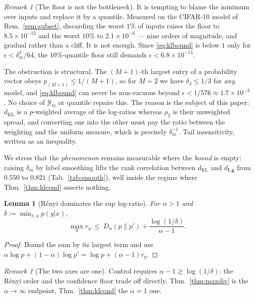 \documentclass[10pt,letterpaper,twocolumn]{article}
\newcommand{\Y}{\mathcal{Y}}
\newcommand{\bff}{\mathbf{f}}
\newcommand{\bfg}{\mathbf{g}}
\newcommand{\dKL}{d_{\mathrm{KL}}}
\newcommand{\dfg}{d_{\bff,\bfg}}
\newcommand{\Dalpha}{D_{\alpha}}
\theoremstyle{plain}
\newtheorem{lemma}[theorem]{Lemma}
\theoremstyle{definition}
\theoremstyle{remark}
\newtheorem{remark}[theorem]{Remark}
\begin{document}
\begin{remark}[The floor is not the bottleneck]
\label{rem:quantile}
It is tempting to blame the minimum over inputs and replace it by a quantile.
Measured on the CIFAR-10 model of Rem.~\ref{rem:subset}, discarding the worst
$1\%$ of inputs raises the floor to $8.5\times10^{-12}$ and the worst $10\%$ to
$2.1\times10^{-6}$ --- nine orders of magnitude, and gradual rather than a
cliff. It is not enough. Since \eqref{eq:klbound} is below $1$ only for
$\epsilon<\delta_{m}^{2}/64$, the $10\%$-quantile floor still demands
$\epsilon<6.8\times10^{-14}$.

The obstruction is structural. The $(M{+}1)$-th largest entry of a probability
vector obeys $p_{(M+1)}\le1/(M+1)$, so for $M=2$ we have $\delta_{3}\le1/3$ for
\emph{any} model, and \eqref{eq:klbound} can never be non-vacuous beyond
$\epsilon<1/576\approx1.7\times10^{-3}$. No choice of $\Y_{m}$ or quantile
repairs this. The reason is the subject of this paper: $\dKL$ is a
$p$-weighted average of the log-ratios whereas $\rho_{2}$ is their unweighted
spread, and converting one into the other must pay the ratio between the
weighting and the uniform measure, which is precisely $\delta_{m}^{-1}$. Tail
insensitivity, written as an inequality.

We stress that the \emph{phenomenon} remains measurable where the
\emph{bound} is empty: raising $\delta_{m}$ by label smoothing lifts the rank
correlation between $\dKL$ and $\dfg$ from $0.550$ to $0.821$
(Tab.~\ref{tab:smooth}), well inside the regime where
Thm.~\ref{thm:klcond} asserts nothing.
\end{remark}

\begin{lemma}[R\'enyi dominates the sup log-ratio]
\label{lem:suff}
For $\alpha>1$ and $\delta:=\min_{x,y}p(y|x)$,
\begin{equation}
\max_{y}r_{y}\ \le\ \Dalpha(p\|p')+\frac{\log(1/\delta)}{\alpha-1}.
\label{eq:suff}
\end{equation}
\end{lemma}
\begin{proof}
Bound the sum by its largest term and use
$\alpha\log p+(1-\alpha)\log p'=\log p+(\alpha-1)r_{y}$.
\end{proof}

\begin{remark}[The two axes are one]
\label{rem:unify}
Control requires $\alpha-1\gtrsim\log(1/\delta)$: the R\'enyi order and the
confidence floor trade off directly. Thm.~\ref{thm:maxdiv} is the
$\alpha\to\infty$ endpoint, Thm.~\ref{thm:klcond} the $\alpha=1$ one.
\end{remark}
\end{document}
